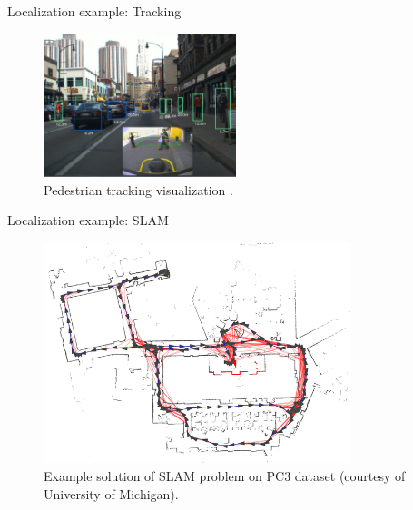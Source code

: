 \documentclass[pdftex, handout]{beamer}
\begin{document}
\begin{frame}{Localization example: Tracking}
  \begin{figure}
  \includegraphics[width=0.5\textwidth,height=0.5\textheight,keepaspectratio]{images/tracking.png}
\caption{Pedestrian tracking visualization \footnotemark.}
\end{figure}

\end{frame}

\begin{frame}[noframenumbering]{Localization example: SLAM}
  \begin{figure}
  \includegraphics[width=0.8\textwidth,height=0.7\textheight,keepaspectratio]{images/slam.png}
\caption{Example solution of SLAM problem on PC3 dataset (courtesy of University of Michigan).}
\end{figure}
\end{frame}
\end{document}
